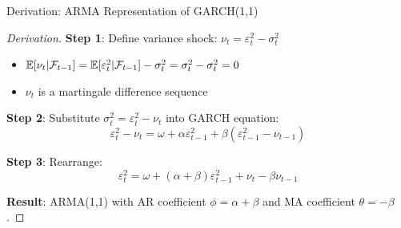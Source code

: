 \documentclass[9pt, aspectratio=169, t]{beamer}
\begin{document}
\begin{frame}{Derivation: ARMA Representation of GARCH(1,1)}
    \begin{proof}[Derivation]
        \textbf{Step 1}: Define variance shock: $\nu_t = \varepsilon_t^2 - \sigma_t^2$
        \begin{itemize}
            \item $\mathbb{E}[\nu_t | \mathcal{F}_{t-1}] = \mathbb{E}[\varepsilon_t^2 | \mathcal{F}_{t-1}] - \sigma_t^2 = \sigma_t^2 - \sigma_t^2 = 0$
            \item $\nu_t$ is a martingale difference sequence
        \end{itemize}

        \vspace{0.2cm}
        \textbf{Step 2}: Substitute $\sigma_t^2 = \varepsilon_t^2 - \nu_t$ into GARCH equation:
        \[
            \varepsilon_t^2 - \nu_t = \omega + \alpha \varepsilon_{t-1}^2 + \beta (\varepsilon_{t-1}^2 - \nu_{t-1})
        \]

        \textbf{Step 3}: Rearrange:
        \[
            \varepsilon_t^2 = \omega + (\alpha + \beta) \varepsilon_{t-1}^2 + \nu_t - \beta \nu_{t-1}
        \]

        \textbf{Result}: ARMA(1,1) with AR coefficient $\phi = \alpha + \beta$ and MA coefficient $\theta = -\beta$.
    \end{proof}
\end{frame}
\end{document}
